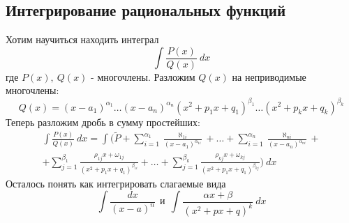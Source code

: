 \subsection{Интегрирование рациональных функций}
Хотим научиться находить интеграл
\[\int\frac{P(x)}{Q(x)}\ dx\]
где $P(x),\ Q(x)$ - многочлены. Разложим $Q(x)$ на неприводимые многочлены:
\[Q(x) = (x-a_1)^{\alpha_1}\dots(x-a_n)^{\alpha_n}(x^2+p_1x+q_1)^{\beta_1}\dots(x^2+p_kx+q_k)^{\beta_k}\]
Теперь разложим дробь в сумму простейших:
\begin{multline*}
    \int\frac{P(x)}{Q(x)}\ dx = \int(\tilde{P} + \sum \limits_{i=1}^{\alpha_1}\frac{\aleph_{1i}}{(x-a_1)^{\alpha_{1i}}} +\dots+ \sum \limits_{i=1}^{\alpha_n}\frac{\aleph_{ni}}{(x-a_n)^{\alpha_{ni}}} + \\
    + \sum \limits_{j=1}^{\beta_1}\frac{\rho_{1j}x + \omega_{1j}}{(x^2+p_1x+q_1)^{\beta_{1i}}} + \dots + \sum \limits_{j=1}^{\beta_k}\frac{\rho_{kj}x + \omega_{kj}}{(x^2+p_1x+q_1)^{\beta_{kj}}})\ dx
\end{multline*}
Осталось понять как интегрировать слагаемые вида
\[\int \frac{dx}{(x-a)^n}\ \ \text{и}\ \ \int \frac{\alpha x+\beta}{(x^2+px+q)^k}\ dx\]
